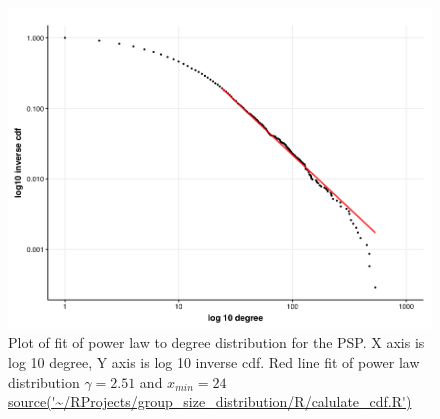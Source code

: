 
\begin{figure}
    \centering
    \includegraphics[width=\linewidth]{images/chapter3/ggplot2/theme/powerlaw/Rplot01_chapter3_cdf_and_powerlaw.png}
    \caption[Plot of power law fit to degree distribution of PSP]{Plot of fit of power law to degree distribution for the PSP. X axis is log 10 degree, Y axis is log 10 inverse cdf. Red line fit of power law distribution $\gamma= 2.51$ and $x_{min}=24$ \url{source('~/RProjects/group_size_distribution/R/calulate_cdf.R')}}
    \label{fig:poweRlaw plot ggplot2}
\end{figure}

